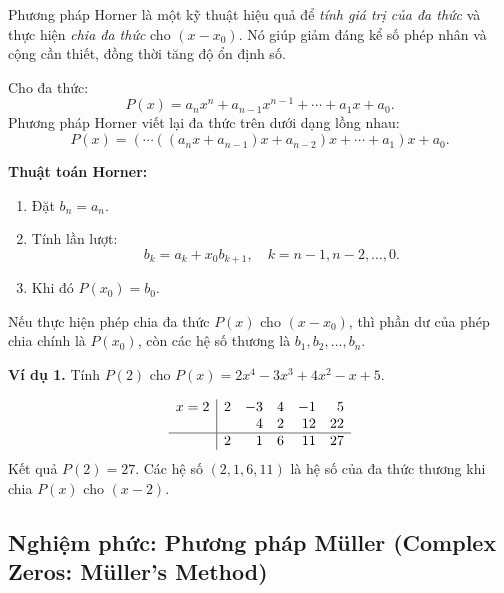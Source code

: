 Phương pháp Horner là một kỹ thuật hiệu quả để \textit{tính giá trị của đa thức} và thực hiện \textit{chia đa thức} cho $(x - x_0)$.  
Nó giúp giảm đáng kể số phép nhân và cộng cần thiết, đồng thời tăng độ ổn định số.

Cho đa thức:
\[
P(x) = a_nx^n + a_{n-1}x^{n-1} + \cdots + a_1x + a_0.
\]
Phương pháp Horner viết lại đa thức trên dưới dạng lồng nhau:
\[
P(x) = (\cdots((a_nx + a_{n-1})x + a_{n-2})x + \cdots + a_1)x + a_0.
\]

\textbf{Thuật toán Horner:}
\begin{enumerate}
    \item Đặt $b_n = a_n$.
    \item Tính lần lượt:
    \[
    b_k = a_k + x_0 b_{k+1}, \quad k = n-1, n-2, \ldots, 0.
    \]
    \item Khi đó $P(x_0) = b_0$.
\end{enumerate}

Nếu thực hiện phép chia đa thức $P(x)$ cho $(x - x_0)$, thì phần dư của phép chia chính là $P(x_0)$, còn các hệ số thương là $b_1, b_2, \ldots, b_n$.

\textbf{Ví dụ 1.}  
Tính $P(2)$ cho $P(x) = 2x^4 - 3x^3 + 4x^2 - x + 5$.

\[
\begin{array}{r|rrrrr}
x=2 & 2 & -3 & 4 & -1 & 5 \\ 
 &   & 4 & 2 & 12 & 22 \\ \hline
 & 2 & 1 & 6 & 11 & 27
\end{array}
\]
Kết quả $P(2) = 27$.  
Các hệ số $(2, 1, 6, 11)$ là hệ số của đa thức thương khi chia $P(x)$ cho $(x - 2)$.

\subsection{Nghiệm phức: Phương pháp Müller (Complex Zeros: Müller's Method)}


